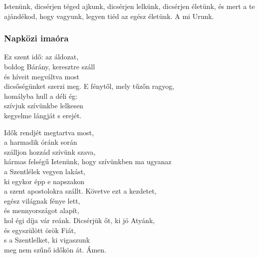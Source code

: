 \documentclass[twoside]{article}
\begin{document}
Istenünk, dicsérjen téged ajkunk, dicsérjen lelkünk, dicsérjen életünk, és mert a te ajándékod, hogy vagyunk, legyen tiéd az egész életünk. A mi Urunk.

\subsubsection*{Napközi imaóra}



\begin{hymnstanzas}
    Ez szent idő: az áldozat,\\
    boldog Bárány, keresztre száll\\
    és híveit megváltva most\\
    dicsőségünket szerzi meg.
\stanzabreak
    E fénytől, mely tűzőn ragyog,\\
    homályba hull a déli ég:\\
    szívjuk szívünkbe lelkesen\\
    kegyelme lángját s erejét.
\end{hymnstanzas}

\begin{hymnstanzas}
    Idők rendjét megtartva most,\\
    a harmadik óránk során\\
    szálljon hozzád szívünk szava,\\
    hármas felségű Istenünk,
\stanzabreak
    hogy szívünkben ma ugyanaz\\
    a Szentlélek vegyen lakást,\\
    ki egykor épp e napszakon\\
    a szent apostolokra szállt.
\stanzabreak
    Követve ezt a kezdetet,\\
    egész világnak fénye lett,\\
    és mennyországot alapít,\\
    hol égi díja vár reánk.
\stanzabreak
    Dicsérjük őt, ki jó Atyánk,\\
    és egyszülött örök Fiát,\\
    s a Szentlelket, ki vigaszunk\\
    meg nem szűnő időkön át. Ámen.
\end{hymnstanzas}
\end{document}
